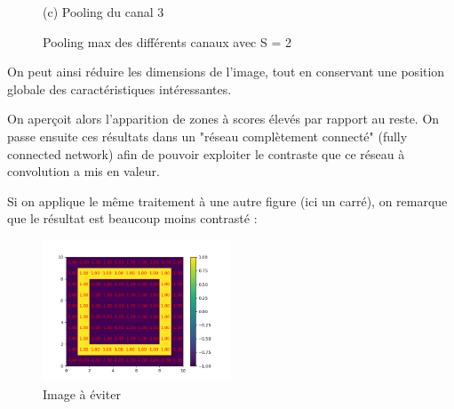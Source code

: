 \begin{figure}[h]
        \center
        (c) Pooling du canal 3
    \endminipage
    \caption{Pooling max des différents canaux avec S = 2}
\end{figure}

On peut ainsi réduire les dimensions de l'image, tout en conservant une position globale des caractéristiques intéressantes.

On aperçoit alors l'apparition de zones à scores élevés par rapport au reste.
On passe ensuite ces résultats dans un "réseau complètement connecté" (fully connected network) 
afin de pouvoir exploiter le contraste que ce réseau à convolution a mis en valeur.

Si on applique le même traitement à une autre figure (ici un carré), on remarque que le résultat est beaucoup moins contrasté :

\begin{figure}[h]
    \center
    \includegraphics[width=0.5\textwidth]{img/cnn_exemple/square/image_carre.png}
    \caption{Image à éviter}
\end{figure}


